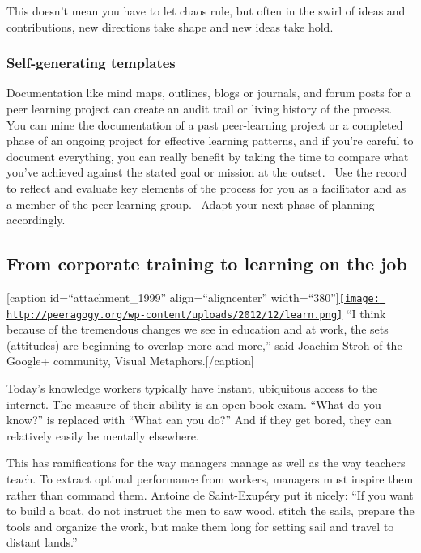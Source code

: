 This doesn't mean you have to let chaos rule, but often in the swirl of
ideas and contributions, new directions take shape and new ideas take
hold.

\subsubsection{Self-generating templates}

Documentation like mind maps, outlines, blogs or journals, and forum
posts for a peer learning project can create an audit trail or living
history of the process. You can mine the documentation of a past
peer-learning project or a completed phase of an ongoing project for
effective learning patterns, and if you're careful to document
everything, you can really benefit by taking the time to compare what
you've achieved against the stated goal or mission at the outset.~ Use
the record to reflect and evaluate key elements of the process for you
as a facilitator and as a member of the peer learning group.~ Adapt your
next phase of planning accordingly.

\subsection{From corporate training to learning on the job}

{[}caption id=``attachment\_1999'' align=``aligncenter''
width=``380''{]}\href{http://peeragogy.org/peer-learning-overview/learn-2/}{\texttt{[image: http://peeragogy.org/wp-content/uploads/2012/12/learn.png]}}
``I think because of the tremendous changes we see in education and at
work, the sets (attitudes) are beginning to overlap more and more,''
said Joachim Stroh of the Google+ community, Visual
Metaphors.{[}/caption{]}

Today's knowledge workers typically have instant, ubiquitous access to
the internet. The measure of their ability is an open-book exam. ``What
do you know?'' is replaced with ``What can you do?'' And if they get
bored, they can relatively easily be mentally elsewhere.

This has ramifications for the way managers manage as well as the way
teachers teach. To extract optimal performance from workers, managers
must inspire them rather than command them. Antoine de Saint-Exupéry put
it nicely: ``If you want to build a boat, do not instruct the men to saw
wood, stitch the sails, prepare the tools and organize the work, but
make them long for setting sail and travel to distant lands.''

